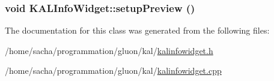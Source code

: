 \hypertarget{class_k_a_l_info_widget_6f960a8c7318fd2b8b29001f6d1fdcbb}{
\subsubsection[{setupPreview}]{\setlength{\rightskip}{0pt plus 5cm}void KALInfoWidget::setupPreview ()}}
\label{class_k_a_l_info_widget_6f960a8c7318fd2b8b29001f6d1fdcbb}




The documentation for this class was generated from the following files:\begin{CompactItemize}
\item 
/home/sacha/programmation/gluon/kal/\hyperlink{kalinfowidget_8h}{kalinfowidget.h}\item 
/home/sacha/programmation/gluon/kal/\hyperlink{kalinfowidget_8cpp}{kalinfowidget.cpp}\end{CompactItemize}
